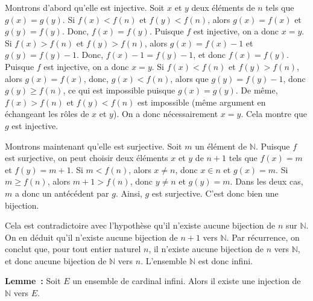     Montrons d'abord qu'elle est injective. 
    Soit $x$ et $y$ deux éléments de $n$ tels que $g(x) = g(y)$. 
    Si $f(x) < f(n)$ et $f(y) < f(n)$, alors $g(x) = f(x)$ et $g(y) = f(y)$. 
    Donc, $f(x) = f(y)$.
    Puisque $f$ est injective, on a donc $x=y$. 
    Si $f(x) > f(n)$ et $f(y) > f(n)$, alors $g(x) = f(x)-1$ et $g(y) = f(y)-1$. 
    Donc, $f(x)-1 = f(y)-1$, et donc $f(x) = f(y)$.
    Puisque $f$ est injective, on a donc $x=y$. 
    Si $f(x) < f(n)$ et $f(y) > f(n)$, alors $g(x) = f(x)$, donc, $g(x) < f(n)$, alors que $g(y) = f(y)-1$, donc $g(y) \geq f(n)$, ce qui est impossible puisque $g(x) = g(y)$.
    De même, $f(x) > f(n)$ et $f(y) < f(n)$ est impossible (même argument en échangeant les rôles de $x$ et $y$). 
    On a donc nécessairement $x=y$. 
    Cela montre que $g$ est injective. 

    Montrons maintenant qu'elle est surjective. 
    Soit $m$ un élément de $\mathbb{N}$. 
    Puisque $f$ est surjective, on peut choisir deux éléments $x$ et $y$ de $n+1$ tels que $f(x) = m$ et $f(y) = m+1$.
    Si $m < f(n)$, alors $x \neq n$, donc $x \in n$ et $g(x) = m$. 
    Si $m \geq f(n)$, alors $m+1 > f(n)$, donc $y \neq n$ et $g(y) = m$.
    Dans les deux cas, $m$ a donc un antécédent par $g$.
    Ainsi, $g$ est surjective. 
    C'est donc bien une bijection. 

    Cela est contradictoire avec l'hypothèse qu'il n'existe aucune bijection de $n$ sur $\mathbb{N}$. 
    On en déduit qu'il n'existe aucune bijection de $n+1$ vers $\mathbb{N}$.
    Par récurrence, on conclut que, pour tout entier naturel $n$, il n'existe aucune bijection de $n$ vers $\mathbb{N}$, et donc aucune bijection de $\mathbb{N}$ vers $n$. 
    L'ensemble $\mathbb{N}$ est donc infini.

    \done 

\medskip

\noindent\textbf{Lemme :} Soit $E$ un ensemble de cardinal infini. Alors il existe une injection de $\mathbb{N}$ vers $E$. 

\medskip

